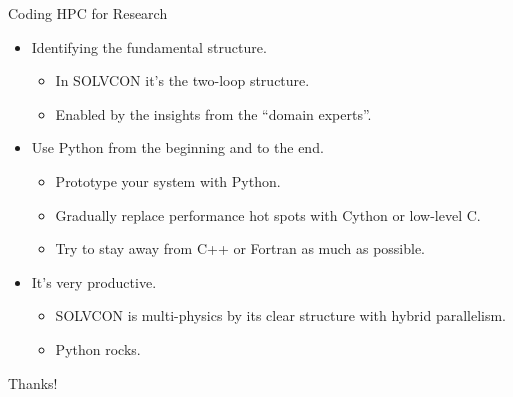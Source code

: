 \documentclass[dvips,xcolor=pst,14pt]{beamer}
\begin{document}
\begin{frame}{
%
Coding HPC for Research
%
}
\begin{itemize}
  \item Identifying the fundamental structure.
  \begin{itemize}
    \item In SOLVCON it's the two-loop structure.
    \item Enabled by the insights from the ``domain experts''.
  \end{itemize}
  \item Use Python from the beginning and to the end.
  \begin{itemize}
    \item Prototype your system with Python.
    \item Gradually replace performance hot spots with Cython or low-level C.
    \item Try to stay away from C++ or Fortran as much
    as possible.
  \end{itemize}
  \item It's very \alert{productive}.
  \begin{itemize} \normalsize
    \item SOLVCON is multi-physics by its clear structure with hybrid
    parallelism.
    \item Python rocks.
  \end{itemize}
\end{itemize}
\end{frame}

\begin{frame}{
%
%
}
\begin{center}
Thanks!
\end{center}
\end{frame}
\end{document}
